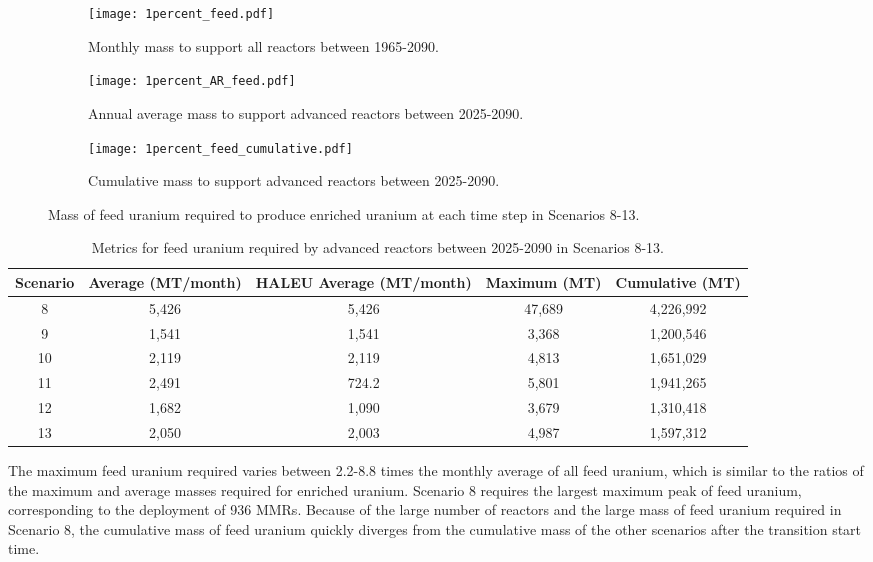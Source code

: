 \begin{figure}[h!]
    \centering
    \begin{subfigure}[b]{0.45\textwidth}
        \centering
        \texttt{[image: 1percent\_feed.pdf]}
        \caption{Monthly mass to support
        all reactors between 1965-2090.}
        \label{fig:1percent_all_feed}
    \end{subfigure}
    \hfill
    \begin{subfigure}[b]{0.45\textwidth}
        \centering
        \texttt{[image: 1percent\_AR\_feed.pdf]}
        \caption{Annual average mass to support advanced reactors between 2025-2090.}
        \label{fig:1percent_AR_feed}
    \end{subfigure}
    \begin{subfigure}[b]{0.45\textwidth}
        \centering
        \texttt{[image: 1percent\_feed\_cumulative.pdf]}
        \caption{Cumulative mass to support 
        advanced reactors between 2025-2090.}
        \label{fig:1percent_feed_cumulative}
    \end{subfigure}
       \caption{Mass of feed uranium required to produce enriched uranium
       at each time step in Scenarios 8-13.}
       \label{fig:1percent_feed}
\end{figure}

\begin{table}[h!]
    \centering 
    \caption{Metrics for feed uranium required by advanced reactors 
    between 2025-2090 in Scenarios 8-13.}
    \label{tab:1percent_feed}
    \begin{tabular}{c c c c c}
        \hline
        Scenario & Average (MT/month) & \gls{HALEU} Average  
        (MT/month) & Maximum (MT) & Cumulative (MT)\\\hline
        8 & 5,426 & 5,426 & 47,689 & 4,226,992\\
        9 & 1,541 & 1,541 & 3,368 & 1,200,546\\
        10 & 2,119 & 2,119 & 4,813 & 1,651,029\\
        11 & 2,491 & 724.2 & 5,801 & 1,941,265\\
        12 & 1,682 & 1,090 & 3,679 & 1,310,418\\
        13 & 2,050 & 2,003 & 4,987 & 1,597,312\\
        \hline
    \end{tabular}
\end{table}

The maximum feed uranium required varies between 2.2-8.8 times the monthly 
average of all feed uranium, which is similar to the ratios of the 
maximum and average masses required for enriched uranium. Scenario 8 
requires the largest maximum peak of 
feed uranium, corresponding to the deployment of 936 \glspl{MMR}. Because 
of 
the large number of reactors and the large mass of feed uranium required 
in Scenario 8, the cumulative mass of feed uranium quickly diverges from 
the cumulative mass of the other scenarios after the transition start time. 

